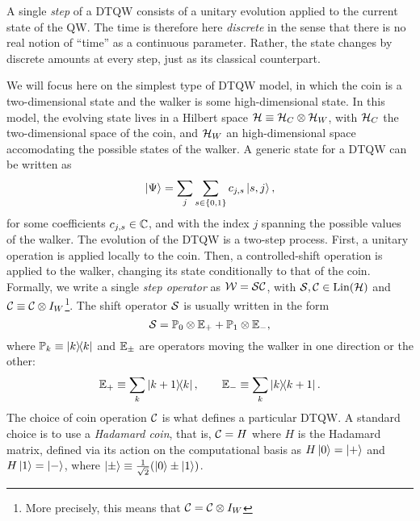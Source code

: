 A single \textit{step} of a \ac{DTQW} consists of a unitary evolution applied to the current state of the \ac{QW}.
The time is therefore here \textit{discrete} in the sense that there is no real notion of ``time'' as a continuous parameter. Rather, the state changes by discrete amounts at every step, just as its classical counterpart.

We will focus here on the simplest type of \ac{DTQW} model, in which the coin is a two-dimensional state and the walker is some high-dimensional state.
In this model, the evolving state lives in a Hilbert space ${\mathcal{H}}\equiv{\mathcal{H}}_C\otimes{\mathcal{H}}_W$, with ${\mathcal{H}}_C$ the two-dimensional space of the coin, and ${\mathcal{H}}_W$ an high-dimensional space accomodating the possible states of the walker.
A generic state for a DTQW can be written as
\begin{equation}
    \ket\Psi = \sum_j \sum_{s\in\{0,1\}} c_{j,s} \ket{s, j},
\end{equation}
for some coefficients $c_{j,s}\in\mathbb{C}$, and with the index $j$ spanning the possible values of the walker.
The evolution of the \ac{DTQW} is a two-step process.
First, a unitary operation is applied locally to the coin.
Then, a controlled-shift operation is applied to the walker, changing its state conditionally to that of the coin.
Formally, we write a single \textit{step operator} as ${\mathcal{W}}={\mathcal{S}}{\mathcal{C}}$, with ${\mathcal{S}},{\mathcal{C}}\in\operatorname{Lin}({\mathcal{H}})$ and ${\mathcal{C}}\equiv{\mathcal{C}}\otimes I_W$\footnote{More precisely, this means that ${\mathcal{C}}={\mathcal{C}}\otimes I_W$}.
The shift operator ${\mathcal{S}}$ is usually written in the form
\begin{equation}
    {\mathcal{S}} = \mathbb{P}_0\otimes \mathbb{E}_+ + \mathbb{P}_1\otimes \mathbb{E}_-,
    \label{eq:qws_shitty_definition_cshift}
\end{equation}
where $\mathbb{P}_k\equiv\ketbra k$ and $\mathbb{E}_\pm$ are operators moving the walker in one direction or the other:
\begin{equation}
    \mathbb{E}_+\equiv \sum_k \ketbra{k+1}{k},
    \qquad
    \mathbb{E}_-\equiv\sum_k\ketbra{k}{k+1}.
\end{equation}
The choice of coin operation ${\mathcal{C}}$ is what defines a particular DTQW.
A standard choice is to use a \textit{Hadamard coin}, that is, ${\mathcal{C}}=H$ where $H$ is the Hadamard matrix, defined via its action on the computational basis as
$H\ket0=\ket+$ and $H\ket1=\ket-$, where $\ket\pm\equiv\frac{1}{\sqrt2}(\ket0\pm\ket1)$.

